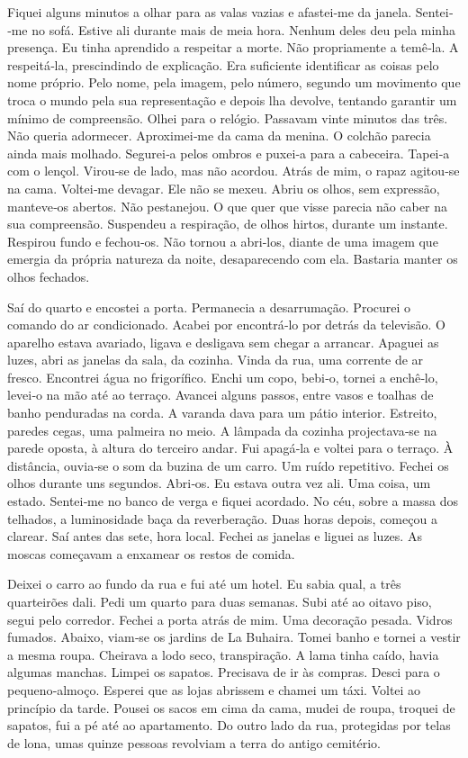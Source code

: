 Fiquei alguns minutos a olhar para as valas vazias e afastei­‑me da
janela. Sentei­‑me no sofá. Estive ali durante mais de meia hora. Nenhum
deles deu pela minha presença. Eu tinha aprendido a respeitar a morte.
Não propriamente a temê­‑la. A respeitá­‑la, prescindindo de explicação.
Era suficiente identificar as coisas pelo nome próprio. Pelo nome, pela
imagem, pelo número, segundo um movimento que troca o mundo pela sua
representação e depois lha devolve, tentando garantir um mínimo de
compreensão. Olhei para o relógio. Passavam vinte minutos das três. Não
queria adormecer. Aproximei­‑me da cama da menina. O colchão parecia
ainda mais molhado. Segurei­‑a pelos ombros e puxei­‑a para a cabeceira.
Tapei­‑a com o lençol. Virou­‑se de lado, mas não acordou. Atrás de mim,
o rapaz agitou­‑se na cama. Voltei­‑me devagar. Ele não se mexeu. Abriu
os olhos, sem expressão, manteve­‑os abertos. Não pestanejou. O que quer
que visse parecia não caber na sua compreensão. Suspendeu a respiração,
de olhos hirtos, durante um instante. Respirou fundo e fechou­‑os. Não
tornou a abri­‑los, diante de uma imagem que emergia da própria natureza
da noite, desaparecendo com ela. Bastaria manter os olhos fechados.

Saí do quarto e encostei a porta. Permanecia a desarrumação. Procurei o
comando do ar condicionado. Acabei por encontrá­‑lo por detrás da
televisão. O aparelho estava avariado, ligava e desligava sem chegar a
arrancar. Apaguei as luzes, abri as janelas da sala, da cozinha. Vinda
da rua, uma corrente de ar fresco. Encontrei água no frigorífico. Enchi
um copo, bebi­‑o, tornei a enchê­‑lo, levei­‑o na mão até ao terraço.
Avancei alguns passos, entre vasos e toalhas de banho penduradas na
corda. A varanda dava para um pátio interior. Estreito, paredes cegas,
uma palmeira no meio. A lâmpada da cozinha projectava­‑se na parede
oposta, à altura do terceiro andar. Fui apagá­‑la e voltei para o
terraço. À distância, ouvia­‑se o som da buzina de um carro. Um ruído
repetitivo. Fechei os olhos durante uns segundos. Abri­‑os. Eu estava
outra vez ali. Uma coisa, um estado. Sentei­‑me no banco de verga e
fiquei acordado. No céu, sobre a massa dos telhados, a luminosidade baça
da reverberação. Duas horas depois, começou a clarear. Saí antes das
sete, hora local. Fechei as janelas e liguei as luzes. As moscas
começavam a enxamear os restos de comida.

Deixei o carro ao fundo da rua e fui até um hotel. Eu sabia qual, a três
quarteirões dali. Pedi um quarto para duas semanas. Subi até ao oitavo
piso, segui pelo corredor. Fechei a porta atrás de mim. Uma decoração
pesada. Vidros fumados. Abaixo, viam­‑se os jardins de La Buhaira. Tomei
banho e tornei a vestir a mesma roupa. Cheirava a lodo seco,
transpiração. A lama tinha caído, havia algumas manchas. Limpei os
sapatos. Precisava de ir às compras. Desci para o pequeno­‑almoço.
Esperei que as lojas abrissem e chamei um táxi. Voltei ao princípio da
tarde. Pousei os sacos em cima da cama, mudei de roupa, troquei de
sapatos, fui a pé até ao apartamento. Do outro lado da rua, protegidas
por telas de lona, umas quinze pessoas revolviam a terra do antigo
cemitério.

